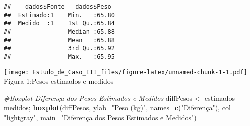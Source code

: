 \documentclass[]{article}
\newenvironment{Shaded}{\begin{snugshade}}{\end{snugshade}}
\newcommand{\KeywordTok}[1]{\textcolor[rgb]{0.13,0.29,0.53}{\textbf{{#1}}}}
\newcommand{\DataTypeTok}[1]{\textcolor[rgb]{0.13,0.29,0.53}{{#1}}}
\newcommand{\DecValTok}[1]{\textcolor[rgb]{0.00,0.00,0.81}{{#1}}}
\newcommand{\StringTok}[1]{\textcolor[rgb]{0.31,0.60,0.02}{{#1}}}
\newcommand{\CommentTok}[1]{\textcolor[rgb]{0.56,0.35,0.01}{\textit{{#1}}}}
\newcommand{\NormalTok}[1]{{#1}}
\begin{document}
\begin{verbatim}
##    dados$Fonte   dados$Peso   
##  Estimado:1    Min.   :65.80  
##  Medido  :1    1st Qu.:65.84  
##                Median :65.88  
##                Mean   :65.88  
##                3rd Qu.:65.92  
##                Max.   :65.95
\end{verbatim}

\begin{Shaded}
\end{Shaded}

\texttt{[image: Estudo\_de\_Caso\_III\_files/figure-latex/unnamed-chunk-1-1.pdf]}
Figura 1:Pesos estimados e medidos

\begin{Shaded}
\begin{Highlighting}[]
\CommentTok{#Boxplot Diferença dos Pesos Estimados e Medidos}
\NormalTok{diffPesos <-}\StringTok{ }\NormalTok{estimados -}\StringTok{ }\NormalTok{medidos;}
\KeywordTok{boxplot}\NormalTok{(diffPesos, }\DataTypeTok{ylab=}\StringTok{"Peso (kg)"}\NormalTok{,}
        \DataTypeTok{names=}\KeywordTok{c}\NormalTok{(}\StringTok{"Diferença"}\NormalTok{), }\DataTypeTok{col =} \StringTok{"lightgray"}\NormalTok{,}
        \DataTypeTok{main=}\StringTok{"Diferença dos Pesos Estimados e Medidos"}\NormalTok{)}
\end{Highlighting}
\end{Shaded}
\end{document}
